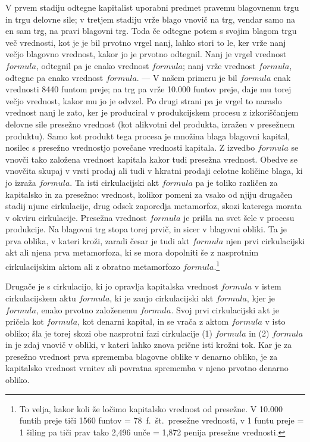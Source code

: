 \documentclass[a5paper]{scrbook}
\begin{document}
V prvem stadiju odtegne kapitalist uporabni predmet pravemu blagovnemu trgu in trgu delovne sile; v tretjem stadiju vrže blago vnovič na trg, vendar samo na en sam trg, na pravi blagovni trg. Toda če odtegne potem s svojim blagom trgu več vrednosti, kot je je bil prvotno vrgel nanj, lahko stori to le, ker vrže nanj večjo blagovno vrednost, kakor jo je prvotno odtegnil. Nanj je vrgel vrednost \( formula \), odtegnil pa je enako vrednost \( formula \); nanj vrže vrednost \( formula \), odtegne pa enako vrednost \( formula \). --- V našem primeru je bil \( formula \) enak vrednosti 8440 funtom preje; na trg pa vrže 10.000 funtov preje, daje mu torej večjo vrednost, kakor mu jo je odvzel. Po drugi strani pa je vrgel to naraslo vrednost nanj le zato, ker je produciral v produkcijskem procesu z izkoriščanjem delovne sile presežno vrednost (kot alikvotni del produkta, izražen v presežnem produktu). Samo kot produkt tega procesa je množina blaga blagovni kapital, nosilec s presežno vrednostjo povečane vrednosti kapitala. Z izvedbo \( formula \) se vnovči tako založena vrednost kapitala kakor tudi presežna vrednost. Obedve se vnovčita skupaj v vrsti prodaj ali tudi v hkratni prodaji celotne količine blaga, ki jo izraža \( formula \). Ta isti cirkulacijski akt \( formula \) pa je toliko različen za kapitalsko in za presežno: vrednost, kolikor pomeni za vsako od njiju drugačen stadij njune cirkulacije, drug odsek zaporedja metamorfoz, skozi katerega morata v okviru cirkulacije. Presežna vrednost \( formula \) je prišla na svet šele v procesu produkcije. Na blagovni trg stopa torej prvič, in sicer v blagovni obliki. Ta je prva oblika, v kateri kroži, zaradi česar je tudi akt \( formula \) njen prvi cirkulacijski akt ali njena prva metamorfoza, ki se mora dopolniti še z nasprotnim cirkulacijskim aktom ali z obratno metamorfozo \( formula \).\footnote{To velja, kakor koli že ločimo kapitalsko vrednost od presežne. V 10.000 funtih preje tiči 1560 funtov = 78~f.~št.\ presežne vrednosti, v 1 funtu preje = 1 šiling pa tiči prav tako 2,496 unče = 1,872 penija presežne vrednosti.}

Drugače je s cirkulacijo, ki jo opravlja kapitalska vrednost \( formula \) v istem cirkulacijskem aktu \( formula \), ki je zanjo cirkulacijski akt \( formula \), kjer je \( formula \), enako prvotno založenemu \( formula \). Svoj prvi cirkulacijski akt je pričela kot \( formula \), kot denarni kapital, in se vrača z aktom \( formula \) v isto obliko; šla je torej skozi obe nasprotni fazi cirkulacije (1) \( formula \) in (2) \( formula \) in je zdaj vnovič v obliki, v kateri lahko znova prične isti krožni tok. Kar je za presežno vrednost prva sprememba blagovne oblike v denarno obliko, je za kapitalsko vrednost vrnitev ali povratna sprememba v njeno prvotno denarno obliko.
\end{document}
